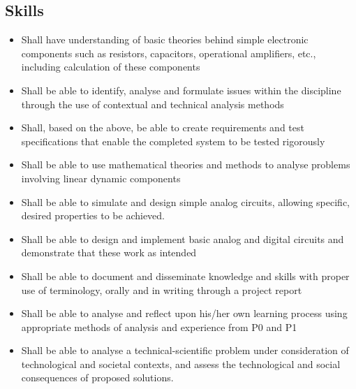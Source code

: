 \subsection{Skills}
\begin{itemize}
	\item Shall have understanding of basic theories behind simple electronic components such as resistors, capacitors, operational amplifiers, etc., including calculation of these components
	\item Shall be able to identify, analyse and formulate issues within the discipline through the use of contextual and technical analysis methods
	\item Shall, based on the above, be able to create requirements and test specifications that enable the completed system to be tested rigorously
	\item Shall be able to use mathematical theories and methods to analyse problems involving linear dynamic components
	\item Shall be able to simulate and design simple analog circuits, allowing specific, desired properties to be achieved.
	\item Shall be able to design and implement basic analog and digital circuits and demonstrate that these work as intended
	\item Shall be able to document and disseminate knowledge and skills with proper use of terminology, orally and in writing through a project report
	\item Shall be able to analyse and reflect upon his/her own learning process using appropriate methods of analysis and experience from P0 and P1
	\item Shall be able to analyse a technical-scientific problem under consideration of technological and societal contexts, and assess the technological and social consequences of proposed solutions.
\end{itemize}

